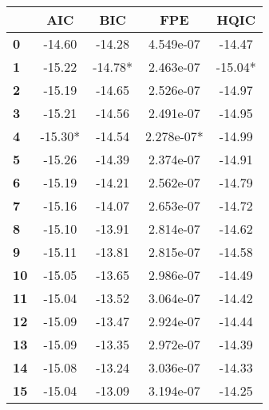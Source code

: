 \begin{center}
\begin{tabular}{lcccc}
\toprule
            & \textbf{AIC} & \textbf{BIC} & \textbf{FPE} & \textbf{HQIC}  \\
\midrule
\textbf{0}  &      -14.60  &      -14.28  &   4.549e-07  &       -14.47   \\
\textbf{1}  &      -15.22  &     -14.78*  &   2.463e-07  &      -15.04*   \\
\textbf{2}  &      -15.19  &      -14.65  &   2.526e-07  &       -14.97   \\
\textbf{3}  &      -15.21  &      -14.56  &   2.491e-07  &       -14.95   \\
\textbf{4}  &     -15.30*  &      -14.54  &  2.278e-07*  &       -14.99   \\
\textbf{5}  &      -15.26  &      -14.39  &   2.374e-07  &       -14.91   \\
\textbf{6}  &      -15.19  &      -14.21  &   2.562e-07  &       -14.79   \\
\textbf{7}  &      -15.16  &      -14.07  &   2.653e-07  &       -14.72   \\
\textbf{8}  &      -15.10  &      -13.91  &   2.814e-07  &       -14.62   \\
\textbf{9}  &      -15.11  &      -13.81  &   2.815e-07  &       -14.58   \\
\textbf{10} &      -15.05  &      -13.65  &   2.986e-07  &       -14.49   \\
\textbf{11} &      -15.04  &      -13.52  &   3.064e-07  &       -14.42   \\
\textbf{12} &      -15.09  &      -13.47  &   2.924e-07  &       -14.44   \\
\textbf{13} &      -15.09  &      -13.35  &   2.972e-07  &       -14.39   \\
\textbf{14} &      -15.08  &      -13.24  &   3.036e-07  &       -14.33   \\
\textbf{15} &      -15.04  &      -13.09  &   3.194e-07  &       -14.25   \\
\bottomrule
\end{tabular}
\end{center}